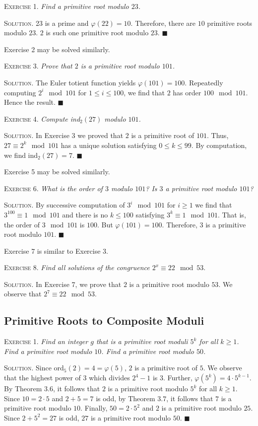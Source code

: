 \documentclass[11pt, leqno]{article}
\newcommand{\done}{\ensuremath{\blacksquare}}
\begin{document}
\textsc{Exercise 1}. \emph{Find a primitive root modulo $23$.}

\textsc{Solution}. 23 is a prime and $\varphi(22) = 10$. Therefore, there are $10$ primitive roots modulo $23$. $2$ is such one primitive root modulo $23$. \done

Exercise 2 may be solved similarly.

\textsc{Exercise 3}. \emph{Prove that $2$ is a primitive root modulo $101$.}

\textsc{Solution}. The Euler totient function yields $\varphi(101) = 100$. Repeatedly computing $2^i \mod 101$ for $1\leq i \leq 100$, we find that $2$ has order $100 \mod 101$. Hence the result. \done

\textsc{Exercise 4}. \emph{Compute \emph{ind}$_2(27)$ modulo $101$.}

\textsc{Solution}. In Exercise 3 we proved that $2$ is a primitive root of $101$. Thus, $27 \equiv 2^k \mod 101$ has a unique solution satisfying $0\leq k \leq 99$. By computation, we find ind$_2(27) = 7$. \done

Exercise 5 may be solved similarly.

\textsc{Exercise 6}. \emph{What is the order of $3$ modulo $101$? Is $3$ a primitive root modulo $101$?}

\textsc{Solution}. By successive computation of $3^i \mod 101$ for $i\geq 1$ we find that $3^{100}\equiv 1 \mod 101$ and there is no $k\leq 100$ satisfying $3^k \equiv 1 \mod 101$. That is, the order of $3 \mod 101$ is $100$. But $\varphi(101) = 100$. Therefore, $3$ is a primitive root modulo $101$. \done

Exercise 7 is similar to Exercise 3.

\textsc{Exercise 8}. \emph{Find all solutions of the congruence $2^x \equiv 22 \mod 53$}.

\textsc{Solution}. In Exercise 7, we prove that $2$ is a primitive root modulo $53$. We observe that $2^7 \equiv 22 \mod 53$. 

\subsection{Primitive Roots to Composite Moduli}

\textsc{Exercise 1}. \emph{Find an integer $g$ that is a primitive root moduli $5^k$ for all $k \geq 1$. Find a primitive root modulo $10$. Find a primitive root modulo $50$.}

\textsc{Solution}. Since ord$_5(2) = 4 = \varphi(5)$, $2$ is a primitive root of $5$. We observe that the highest power of $3$ which divides $2^4-1$ is $3$. Further, $\varphi(5^k) = 4\cdot 5^{k-1}$. By Theorem $3.6$, it follows that $2$ is a primitive root modulo $5^k$ for all $k\geq 1$. Since $10 = 2\cdot 5$ and $2+5 = 7 $ is odd, by Theorem $3.7$, it follows that $7$ is a primitive root modulo $10$. Finally, $50 = 2 \cdot 5^2$ and $2$ is a primitive root modulo $25$. Since $2+5^2 = 27$ is odd, $27$ is a primitive root modulo $50$. \done
\end{document}
